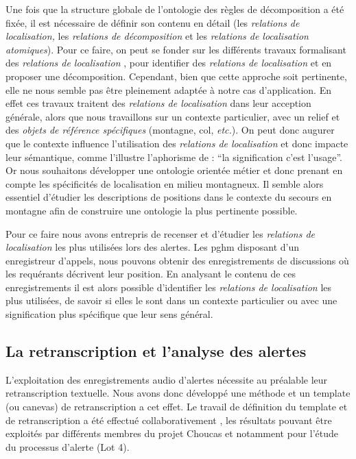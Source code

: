 Une fois que la structure globale de l'ontologie des règles de
décomposition a été fixée, il est nécessaire de définir son contenu en
détail (\ie les \emph{relations de localisation,} les \emph{relations
  de décomposition} et les \emph{relations de localisation
  atomiques}). Pour ce faire, on peut se fonder sur les différents
travaux formalisant des \emph{relations de localisation}
\autocite{Vandeloise1986,Aurnague1997,Borillo1998}, pour identifier
des \emph{relations de localisation} et en proposer une
décomposition. Cependant, bien que cette approche soit pertinente,
elle ne nous semble pas être pleinement adaptée à notre cas
d’application. En effet ces travaux traitent des \emph{relations de
  localisation} dans leur acception générale, alors que nous
travaillons sur un contexte particulier, avec un relief et des
\emph{objets de référence spécifiques} (\eg montagne, col,
\emph{etc.}). On peut donc augurer que le contexte influence
l’utilisation des \emph{relations de localisation} et donc impacte
leur sémantique, comme l'illustre l'aphorisme de  :
\enquote{la signification c'est l'usage}. Or nous souhaitons
développer une ontologie orientée métier et donc prenant en compte les
spécificités de localisation en milieu montagneux. Il semble alors
essentiel d'étudier les descriptions de positions dans le contexte du
secours en montagne afin de construire une ontologie la plus
pertinente possible.

Pour ce faire nous avons entrepris de recenser et d'étudier les
\emph{relations de localisation} les plus utilisées lors des
alertes. Les \ac{pghm} disposant d'un enregistreur d'appels, nous
pouvons obtenir des enregistrements de discussions où les requérants
décrivent leur position. En analysant le contenu de ces
enregistrements il est alors possible d'identifier les \emph{relations
  de localisation} les plus utilisées, de savoir si elles le sont dans
un contexte particulier ou avec une signification plus spécifique que
leur sens général.

\subsection{La retranscription et l'analyse des alertes}

L'exploitation des enregistrements audio d'alertes nécessite au
préalable leur retranscription textuelle. Nous avons donc développé
une méthode et un template (ou canevas) de retranscription a cet
effet. Le travail de définition du template et de retranscription a
été effectué collaborativement \autocite{Bunel2019}, les résultats
pouvant être exploités par différents membres du projet Choucas et
notamment pour l'étude du processus d'alerte (Lot 4).

